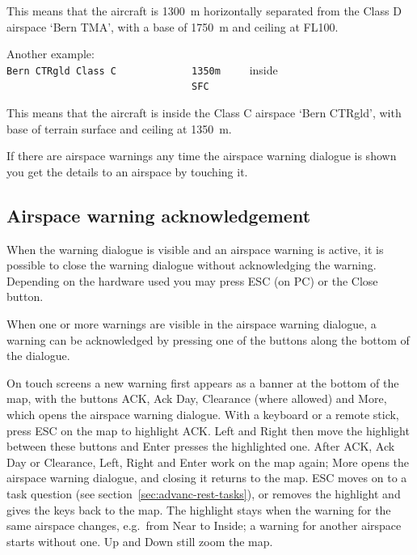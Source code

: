 This means that the aircraft is 1300~m horizontally separated from the Class D airspace
`Bern TMA', with a base of 1750~m and ceiling at FL100.

Another example:\\
\verb+Bern CTRgld Class C             1350m     +\colorbox{AirspaceRed}{inside}\\
\verb+                                SFC+

This means that the aircraft is inside the Class C airspace `Bern
CTRgld', with base of terrain surface and ceiling at 1350~m.

If there are airspace warnings any time the airspace warning dialogue is shown 
you get the details to an airspace by touching it.


\subsection*{Airspace warning acknowledgement}

When the warning dialogue is visible and an airspace warning is
active, it is possible to close the warning dialogue without acknowledging the warning.
Depending on the hardware used you may press ESC (on PC) or the Close button.

When one or more warnings are visible in the airspace warning dialogue,
a warning can be acknowledged by pressing one of the buttons along the bottom
of the dialogue.

On touch screens a new warning first appears as a banner at the bottom
of the map, with the buttons ACK, Ack Day, Clearance (where allowed)
and More, which opens the airspace warning dialogue.  With a keyboard
or a remote stick, press ESC on the map to highlight ACK.  Left and
Right then move the highlight between these buttons and Enter presses
the highlighted one.  After ACK, Ack Day or Clearance, Left, Right
and Enter work on the map again; More opens the airspace warning
dialogue, and closing it returns to the map.  ESC moves on to a task
question (see section~\ref{sec:advanc-rest-tasks}), or removes the
highlight and gives the keys back to the map.  The highlight stays
when the warning for the same airspace changes, e.g.\ from Near to
Inside; a warning for another airspace starts without one.  Up and
Down still zoom the map.

